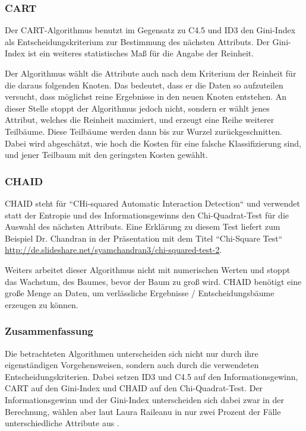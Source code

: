 \subsubsection{CART}
Der CART-Algorithmus benutzt im Gegensatz zu C4.5 und ID3 den Gini-Index als Entscheidungskriterium zur Bestimmung des nächsten Attributs. \cite{rapidminer_rapidminer_2015} Der Gini-Index ist ein weiteres statistisches Maß für die Angabe der Reinheit. 

Der Algorithmus wählt die Attribute auch nach dem Kriterium der Reinheit für die daraus folgenden Knoten. Das bedeutet, dass er die Daten so aufzuteilen versucht, dass möglichst reine Ergebnisse in den neuen Knoten entstehen. An dieser Stelle stoppt der Algorithmus jedoch nicht, sondern er wählt jenes Attribut, welches die Reinheit maximiert, und erzeugt  eine Reihe weiterer Teilbäume. Diese Teilbäume werden dann bis zur Wurzel zurückgeschnitten. Dabei wird abgeschätzt, wie hoch die Kosten für eine falsche Klassifizierung sind, und jener Teilbaum mit den geringsten Kosten gewählt. \cite{wei-yin_loh_classification_2008}

\subsubsection{CHAID}
CHAID steht für ``CHi-squared Automatic Interaction Detection`` und verwendet statt der Entropie und des Informationsgewinns den Chi-Quadrat-Test für die Auswahl des nächsten Attributs. Eine Erklärung zu diesem Test liefert zum Beispiel Dr. Chandran in der Präsentation mit dem Titel ``Chi-Square Test``  \url{http://de.slideshare.net/syamchandran3/chi-squared-test-2}. \cite{rapidminer_rapidminer_2015}

Weiters arbeitet dieser Algorithmus nicht mit numerischen Werten und stoppt das Wachstum, des Baumes, bevor der Baum zu groß wird. CHAID benötigt eine große Menge an Daten, um verlässliche Ergebnisse / Entscheidungsbäume erzeugen zu können.\cite{rapidminer_rapidminer_2015}

\subsubsection{Zusammenfassung}
Die betrachteten Algorithmen unterscheiden sich nicht nur durch ihre eigenständigen Vorgehensweisen, sondern auch durch die verwendeten Entscheidungskriterien. Dabei setzen ID3 und C4.5 auf den Informationsgewinn, CART auf den Gini-Index und CHAID auf den Chi-Quadrat-Test. Der Informationsgewinn und der Gini-Index unterscheiden sich dabei zwar in der Berechnung, wählen aber laut Laura Raileanu in nur zwei Prozent der Fälle unterschiedliche Attribute aus \cite{laura_raileanu_2004}. 

